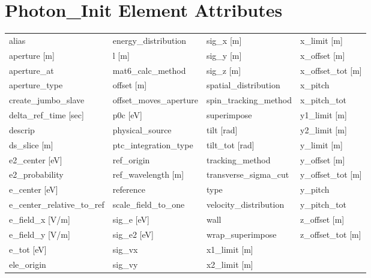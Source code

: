  \section{Photon_Init Element Attributes}
 \label{s:list.photon.init}
 
 \begin{tabular}{llll} \toprule
alias                            & energy_distribution              & sig_x [m]                        & x_limit [m]                      \\
aperture [m]                     & l [m]                            & sig_y [m]                        & x_offset [m]                     \\
aperture_at                      & mat6_calc_method                 & sig_z [m]                        & x_offset_tot [m]                 \\
aperture_type                    & offset [m]                       & spatial_distribution             & x_pitch                          \\
create_jumbo_slave               & offset_moves_aperture            & spin_tracking_method             & x_pitch_tot                      \\
delta_ref_time [sec]             & p0c [eV]                         & superimpose                      & y1_limit [m]                     \\
descrip                          & physical_source                  & tilt [rad]                       & y2_limit [m]                     \\
ds_slice [m]                     & ptc_integration_type             & tilt_tot [rad]                   & y_limit [m]                      \\
e2_center [eV]                   & ref_origin                       & tracking_method                  & y_offset [m]                     \\
e2_probability                   & ref_wavelength [m]               & transverse_sigma_cut             & y_offset_tot [m]                 \\
e_center [eV]                    & reference                        & type                             & y_pitch                          \\
e_center_relative_to_ref         & scale_field_to_one               & velocity_distribution            & y_pitch_tot                      \\
e_field_x [V/m]                  & sig_e [eV]                       & wall                             & z_offset [m]                     \\
e_field_y [V/m]                  & sig_e2 [eV]                      & wrap_superimpose                 & z_offset_tot [m]                 \\
e_tot [eV]                       & sig_vx                           & x1_limit [m]                     &                                  \\
ele_origin                       & sig_vy                           & x2_limit [m]                     &                                  \\
 \bottomrule
 \end{tabular}
 \vfill
 
